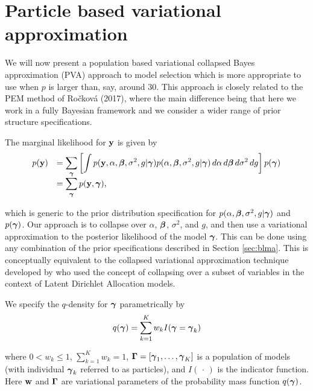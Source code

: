 \section{Particle based variational approximation}
\label{sec:pb-pva}

We will now present a population based variational collapsed Bayes
approximation (PVA) approach to model selection which is more appropriate to
use when $p$ is larger than, say, around $30$. This approach is closely related
to the PEM  method of Ro\v{c}kov\'{a} (2017), where the main difference being
that here we work in a fully Bayesian framework and we consider a wider range
of prior structure specifications.

The marginal likelihood for ${\bf y}$ is given by
$$
\begin{array}{rl}
\displaystyle p({\bf y}) 
& \displaystyle = \sum_{{\boldsymbol \gamma}} \left[ \int p({\bf y},\alpha,{\boldsymbol \beta},\sigma^2,g|{\boldsymbol \gamma}) p(\alpha,{\boldsymbol \beta},\sigma^2,g|{\boldsymbol \gamma}) \, d\alpha \, d{\boldsymbol \beta} \, d\sigma^2 \, dg\right] p({\boldsymbol \gamma}) 
\\
& \displaystyle = \sum_{{\boldsymbol \gamma}} p({\bf y},{\boldsymbol \gamma}),
\end{array} 
$$

\noindent which is generic to the  prior distribution specification for
$p(\alpha,{\boldsymbol \beta},\sigma^2,g|{\boldsymbol \gamma})$ and $p({\boldsymbol \gamma})$.  Our approach is to
collapse over $\alpha$, ${\boldsymbol \beta}$, $\sigma^2$, and $g$, and then use a
variational approximation to the posterior likelihood of the model ${\boldsymbol \gamma}$.
This can be done using any combination of the prior specifications described in
Section \ref{sec:blma}.  This is conceptually equivalent to the collapsed
variational approximation technique developed by \cite{Teh2006}  who used the
concept of collapsing over a subset of variables in the context of  Latent
Dirichlet Allocation models.

We specify the $q$-density for ${\boldsymbol \gamma}$ parametrically by
\begin{equation}\label{eq:qgamma} 
q({\boldsymbol \gamma}) = \sum_{k=1}^K w_k I({\boldsymbol \gamma} = {\boldsymbol \gamma}_k)
\end{equation} 

\noindent where $0 < w_k \le 1$, $\sum_{k=1}^K w_k = 1$, ${\boldsymbol \Gamma} =
[{\boldsymbol \gamma}_1,\ldots,{\boldsymbol \gamma}_K]$ is a population of models (with individual
${\boldsymbol \gamma}_k$ referred to as particles), and $I(\,\cdot\,)$ is the indicator
function. Here ${\bf w}$ and ${\boldsymbol \Gamma}$ are variational parameters of the
probability mass function $q({\boldsymbol \gamma})$.

